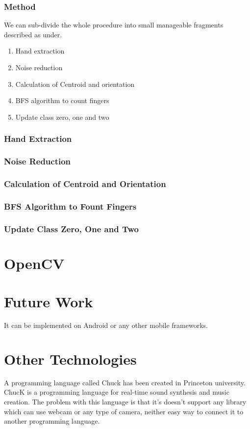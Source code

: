 \documentclass{report}
\begin{document}
\subsubsection{Method}
We can sub-divide the whole procedure into small manageable fragments described as under.
\begin{enumerate}
\item{Hand extraction}
\item{Noise reduction}
\item{Calculation of Centroid and orientation}
\item{BFS algorithm to count fingers}
\item{Update class zero, one and two}
\end{enumerate}
\subsubsection{Hand Extraction}


\subsubsection{Noise Reduction}


\subsubsection{Calculation of Centroid and Orientation}

\subsubsection{BFS Algorithm to Fount Fingers}

\subsubsection{Update Class Zero, One and Two}

\section{OpenCV}

\section{Future Work}
It can be implemented on Android or any other mobile frameworks.
\section{Other Technologies}
A programming language called Chuck has been created in Princeton university. ChucK is a programming language for real-time sound synthesis and music creation. The problem with this language is that it's doesn't support any library which can use webcam or any type of camera, neither easy way to connect it to another programming language.


\end{document}
